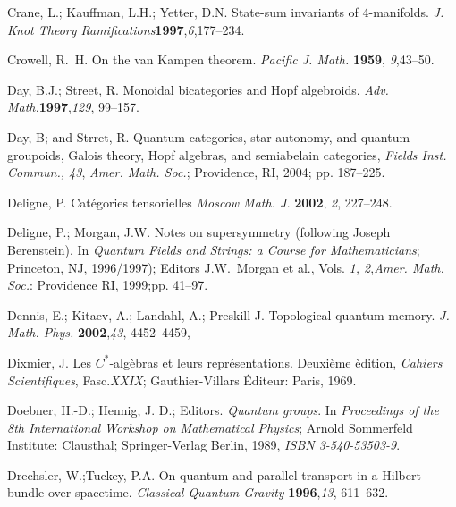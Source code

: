 \documentclass[12pt]{article}
\theoremstyle{plain}
\theoremstyle{definition}
\numberwithin{equation}{section}
\begin{document}
\begin{thebibliography}{199}

Crane, L.; Kauffman, L.H.;  Yetter, D.N.  State-sum invariants of 4-manifolds. \textit{J. Knot Theory Ramifications}{\bf 1997},{\em 6},177--234. 

Crowell, R.~H. On the van {K}ampen theorem. {\em Pacific J. Math.}  {\bf 1959}, {\em 9},43--50.

Day, B.J.; Street, R.  Monoidal bicategories and Hopf algebroids. \textit{Adv. Math.}{\bf 1997},{\em 129}, 99--157.

Day, B; and Strret, R. Quantum categories, star autonomy, and quantum groupoids, Galois theory, Hopf algebras, and semiabelain categories, \emph{Fields Inst. Commun., 43}, {\em Amer. Math. Soc.}; Providence, RI, 2004; pp. 187--225.

Deligne, P.  Cat\'egories tensorielles \textit{Moscow Math. J.}  {\bf 2002}, {\em 2}, 227--248.

Deligne, P.; Morgan, J.W.  Notes on supersymmetry (following Joseph Berenstein).  In  {\em Quantum Fields and Strings: a Course for Mathematicians}; Princeton, NJ, 1996/1997); Editors J.W.~Morgan et al., Vols. {\em 1, 2},{\em Amer. Math. Soc.}: Providence RI, 1999;pp. 41--97.

Dennis, E.; Kitaev, A.; Landahl, A.; Preskill J. Topological quantum memory. \textit{J. Math. Phys.} {\bf 2002},{\em 43}, 4452--4459, %

Dixmier, J.  Les $C^*$-alg\`ebras et leurs repr\'esentations. Deuxi\`eme \`edition, {\it Cahiers Scientifiques}, Fasc.{\em XXIX}; Gauthier-Villars \'Editeur: Paris, 1969.

Doebner, H.-D.; Hennig, J. D.; Editors. \textit{Quantum groups}. In {\em Proceedings of the 8th International Workshop on Mathematical Physics}; Arnold Sommerfeld Institute: Clausthal; Springer-Verlag Berlin, 1989, \textit{ISBN 3-540-53503-9}.

Drechsler, W.;Tuckey, P.A.  On quantum and parallel transport in a Hilbert bundle over spacetime. \textit{Classical  Quantum Gravity} {\bf 1996},{\em 13}, 611--632.  



\end{thebibliography}
\end{document}
